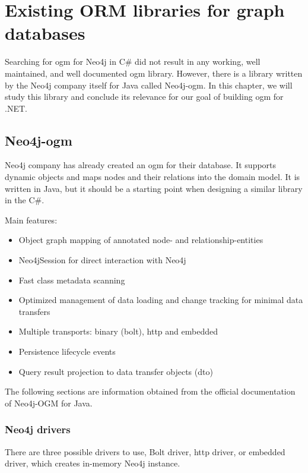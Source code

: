 \chapter {Existing ORM libraries for graph databases}

Searching for \acrshort{ogm} for Neo4j in C\# did not result in any working, well maintained, and well documented \acrshort{ogm} library.
However, there is a library written by the Neo4j company itself for Java called Neo4j-\acrshort{ogm}. In this chapter, we will study this library
and conclude its relevance for our goal of building \acrshort{ogm} for .NET.

\section{Neo4j-\acrshort{ogm}}

Neo4j company has already created an \acrshort{ogm} for their database. It supports dynamic objects and maps nodes and their relations into the domain model.
It is written in Java, but it should be a starting point when designing a similar library in the C\#.

\noindent Main features:
\begin{itemize}
    \item Object graph mapping of annotated node- and relationship-entities
    \item Neo4jSession for direct interaction with Neo4j
    \item Fast class metadata scanning
    \item Optimized management of data loading and change tracking for minimal data transfers
    \item Multiple transports: binary (bolt), \acrshort{http} and embedded
    \item Persistence lifecycle events
    \item Query result projection to data transfer objects (\acrshort{dto})
\end{itemize}

The following sections are information obtained from the official documentation of Neo4j-OGM for Java. \cite{noauthor_reference_nodate}

\subsection {Neo4j drivers}

There are three possible drivers to use, Bolt driver, \acrshort{http} driver, or embedded driver, which creates in-memory Neo4j instance.

